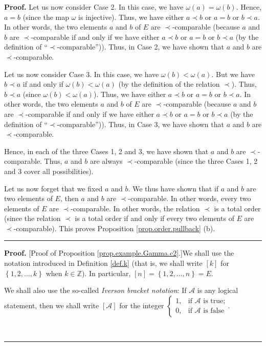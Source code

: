 \documentclass[numbers=enddot,12pt,final,onecolumn,notitlepage,abstracton]{scrartcl}
\theoremstyle{definition}
\newenvironment{proof}[1][Proof]{\noindent\textbf{#1.} }{\ \rule{0.5em}{0.5em}}
\newenvironment{verlong}{}{}
\newenvironment{noncompile}{}{}
\begin{document}
\begin{verlong}
\begin{footnotesize}
\begin{noncompile}
\begin{proof}
Let us now consider Case 2. In this case, we have $\omega\left(  a\right)
=\omega\left(  b\right)  $. Hence, $a=b$ (since the map $\omega$ is
injective). Thus, we have either $a\prec b$ or $a=b$ or $b\prec a$. In other
words, the two elements $a$ and $b$ of $E$ are $\prec$-comparable (because $a$
and $b$ are $\prec$-comparable if and only if we have either $a\prec b$ or
$a=b$ or $b\prec a$ (by the definition of \textquotedblleft$\prec
$-comparable\textquotedblright)). Thus, in Case 2, we have shown that $a$ and
$b$ are $\prec$-comparable.

Let us now consider Case 3. In this case, we have $\omega\left(  b\right)
<\omega\left(  a\right)  $. But we have $b\prec a$ if and only if
$\omega\left(  b\right)  <\omega\left(  a\right)  $ (by the definition of the
relation $\prec$). Thus, $b\prec a$ (since $\omega\left(  b\right)
<\omega\left(  a\right)  $). Thus, we have either $a\prec b$ or $a=b$ or
$b\prec a$. In other words, the two elements $a$ and $b$ of $E$ are $\prec
$-comparable (because $a$ and $b$ are $\prec$-comparable if and only if we
have either $a\prec b$ or $a=b$ or $b\prec a$ (by the definition of
\textquotedblleft$\prec$-comparable\textquotedblright)). Thus, in Case 3, we
have shown that $a$ and $b$ are $\prec$-comparable.

Hence, in each of the three Cases 1, 2 and 3, we have shown that $a$ and $b$
are $\prec$-comparable. Thus, $a$ and $b$ are always $\prec$-comparable (since
the three Cases 1, 2 and 3 cover all possibilities).

Let us now forget that we fixed $a$ and $b$. We thus have shown that if $a$
and $b$ are two elements of $E$, then $a$ and $b$ are $\prec$-comparable. In
other words, every two elements of $E$ are $\prec$-comparable. In other words,
the relation $\prec$ is a total order (since the relation $\prec$ is a total
order if and only if every two elements of $E$ are $\prec$-comparable). This
proves Proposition \ref{prop.order.pullback} (b).
\end{proof}
\end{noncompile}

\begin{proof}
[Proof of Proposition \ref{prop.example.Gamma.c2}.]We shall use the notation
introduced in Definition \ref{def.k} (that is, we shall write $\left[
k\right]  $ for $\left\{  1,2,\ldots,k\right\}  $ when $k\in\mathbb{Z}$). In
particular, $\left[  n\right]  =\left\{  1,2,\ldots,n\right\}  =E$.

We shall also use the so-called \textit{Iverson bracket notation}: If
$\mathcal{A}$ is any logical statement, then we shall write $\left[
\mathcal{A}\right]  $ for the integer $%
\begin{cases}
1, & \text{if }\mathcal{A}\text{ is true;}\\
0, & \text{if }\mathcal{A}\text{ is false}%
\end{cases}
$.


\end{proof}
\end{footnotesize}
\end{verlong}
\end{document}
